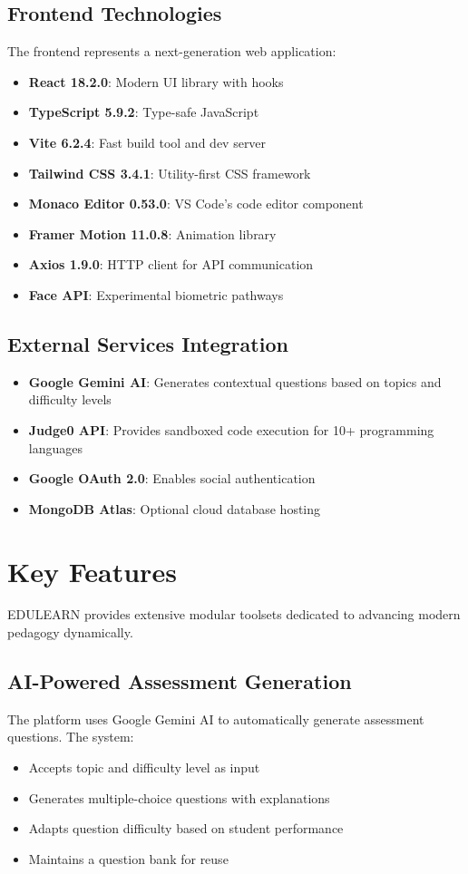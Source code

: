 \documentclass[conference]{IEEEtran}
\begin{document}
\subsection{Frontend Technologies}
The frontend represents a next-generation web application:
\begin{itemize}
    \item \textbf{React 18.2.0}: Modern UI library with hooks
    \item \textbf{TypeScript 5.9.2}: Type-safe JavaScript
    \item \textbf{Vite 6.2.4}: Fast build tool and dev server
    \item \textbf{Tailwind CSS 3.4.1}: Utility-first CSS framework
    \item \textbf{Monaco Editor 0.53.0}: VS Code's code editor component
    \item \textbf{Framer Motion 11.0.8}: Animation library
    \item \textbf{Axios 1.9.0}: HTTP client for API communication
    \item \textbf{Face API}: Experimental biometric pathways
\end{itemize}

\subsection{External Services Integration}
\begin{itemize}
    \item \textbf{Google Gemini AI}: Generates contextual questions based on topics and difficulty levels
    \item \textbf{Judge0 API}: Provides sandboxed code execution for 10+ programming languages
    \item \textbf{Google OAuth 2.0}: Enables social authentication
    \item \textbf{MongoDB Atlas}: Optional cloud database hosting
\end{itemize}

\section{Key Features}

EDULEARN provides extensive modular toolsets dedicated to advancing modern pedagogy dynamically.

\subsection{AI-Powered Assessment Generation}
The platform uses Google Gemini AI to automatically generate assessment questions. The system:
\begin{itemize}
    \item Accepts topic and difficulty level as input
    \item Generates multiple-choice questions with explanations
    \item Adapts question difficulty based on student performance
    \item Maintains a question bank for reuse
\end{itemize}
\end{document}
